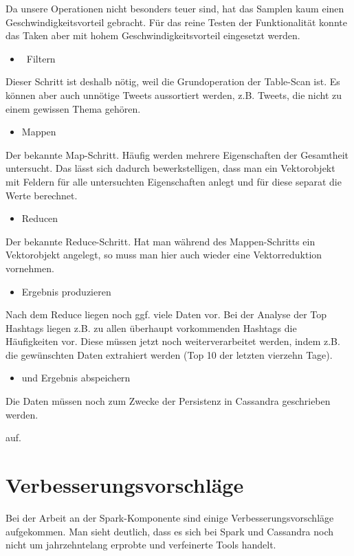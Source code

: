 Da unsere Operationen nicht besonders teuer sind, hat das Samplen kaum
einen Geschwindigkeitsvorteil gebracht. Für das reine Testen der
Funktionalität konnte das Taken aber mit hohem Geschwindigkeitsvorteil
eingesetzt werden.

\begin{itemize}
\item \ Filtern
\end{itemize}
Dieser Schritt ist deshalb nötig, weil die Grundoperation der Table-Scan
ist. Es können aber auch unnötige Tweets aussortiert werden, z.B.
Tweets, die nicht zu einem gewissen Thema gehören.

\begin{itemize}
\item Mappen
\end{itemize}
Der bekannte Map-Schritt. Häufig werden mehrere Eigenschaften der
Gesamtheit untersucht. Das lässt sich dadurch bewerkstelligen, dass man
ein Vektorobjekt mit Feldern für alle untersuchten Eigenschaften anlegt
und für diese separat die Werte berechnet.

\begin{itemize}
\item Reducen
\end{itemize}
Der bekannte Reduce-Schritt. Hat man während des Mappen-Schritts ein
Vektorobjekt angelegt, so muss man hier auch wieder eine Vektorreduktion
vornehmen.

\begin{itemize}
\item Ergebnis produzieren
\end{itemize}
Nach dem Reduce liegen noch ggf. viele Daten vor. Bei der Analyse der
Top Hashtags liegen z.B. zu allen überhaupt vorkommenden Hashtags die
Häufigkeiten vor. Diese müssen jetzt noch weiterverarbeitet werden, indem
 z.B. die gewünschten Daten extrahiert werden (Top 10 der letzten
vierzehn Tage).

\begin{itemize}
\item und Ergebnis abspeichern
\end{itemize}
Die Daten müssen noch zum Zwecke der Persistenz in Cassandra geschrieben
werden.

auf.


\bigskip

\section{Verbesserungsvorschläge}
Bei der Arbeit an der Spark-Komponente sind einige
Verbesserungsvorschläge aufgekommen. Man sieht deutlich, dass es sich
bei Spark und Cassandra noch nicht um jahrzehntelang erprobte und
verfeinerte Tools handelt.


